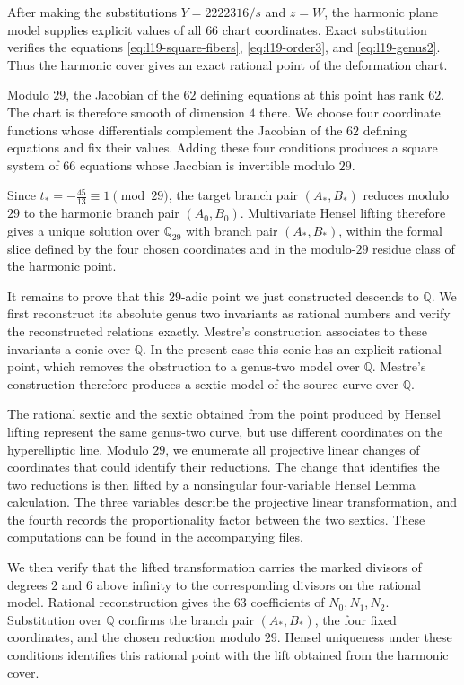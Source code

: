 \documentclass[10pt]{amsart}
\numberwithin{equation}{section}
\theoremstyle{definition}
\theoremstyle{remark}
\newcommand{\Q}{\mathbb{Q}}
\begin{document}
  
   After making the substitutions $Y=2222316/s$ and $z=W$, the harmonic plane model supplies explicit values of all $66$ chart coordinates. Exact substitution verifies the equations
  \eqref{eq:l19-square-fibers}, \eqref{eq:l19-order3}, and
  \eqref{eq:l19-genus2}. Thus the harmonic cover gives an exact rational
  point of the deformation chart.

  Modulo $29$, the Jacobian of the $62$ defining equations at this point has
  rank $62$.  The chart is therefore smooth of dimension $4$ there.  We choose four coordinate functions whose differentials complement the
  Jacobian of the $62$ defining equations and fix their values. Adding these four conditions produces a square system of $66$ equations whose Jacobian is invertible
  modulo $29$.

  Since $t_*=-\frac{45}{13}\equiv1\pmod{29}$, the target branch pair $(A_*,B_*)$ reduces modulo $29$ to the harmonic
  branch pair $(A_0,B_0)$.  Multivariate Hensel lifting therefore gives a
  unique solution over $\Q_{29}$ with branch pair $(A_*,B_*)$, within the
  formal slice defined by the four chosen coordinates and in the modulo-$29$
  residue class of the harmonic point.

  It remains to prove that this $29$-adic point we just constructed descends to $\Q$.  We first
  reconstruct its absolute genus two invariants as rational numbers and verify the reconstructed relations exactly. Mestre's construction \cite{Mestre1991} associates to
  these invariants a conic over $\Q$.  In the present case this conic has an
  explicit rational point, which removes the obstruction to a genus-two
  model over $\Q$. Mestre's construction therefore produces a
  sextic model of the source curve over $\Q$.

 The rational sextic and the sextic obtained from the point produced by Hensel
  lifting represent the same genus-two curve, but use different coordinates on
  the hyperelliptic line. Modulo $29$, we enumerate all projective linear changes of
  coordinates that could identify their reductions. The change that
  identifies the two reductions is then lifted by a nonsingular four-variable
  Hensel Lemma calculation. The three variables describe the projective linear transformation,
  and the fourth records the proportionality factor between the two sextics. These computations can be found in the accompanying files.

  We then verify that the lifted transformation carries the marked divisors
  of degrees $2$ and $6$ above infinity to the corresponding divisors on the rational model. Rational reconstruction gives the $63$ coefficients of $N_0,N_1,N_2$.
  Substitution over $\Q$ confirms the branch pair $(A_*,B_*)$, the four fixed
  coordinates, and the chosen reduction modulo $29$. Hensel uniqueness under
  these conditions identifies this rational point with the lift obtained from
  the harmonic cover.
 
\end{document}
